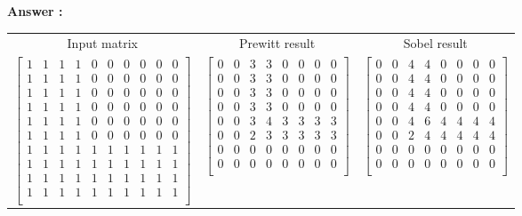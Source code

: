 \begin{list}{
\textbf{Answer :}~}{}
\begin{table}[]
    \centering
    \begin{tabular}{ccc}
        Input matrix & Prewitt result & Sobel result  \\
        $\left[\begin{smallmatrix}
        1 & 1 & 1 & 1 & 0 & 0 & 0 & 0 & 0 & 0\\
        1 & 1 & 1 & 1 & 0 & 0 & 0 & 0 & 0 & 0\\
        1 & 1 & 1 & 1 & 0 & 0 & 0 & 0 & 0 & 0\\
        1 & 1 & 1 & 1 & 0 & 0 & 0 & 0 & 0 & 0\\
        1 & 1 & 1 & 1 & 0 & 0 & 0 & 0 & 0 & 0\\
        1 & 1 & 1 & 1 & 0 & 0 & 0 & 0 & 0 & 0\\
        1 & 1 & 1 & 1 & 1 & 1 & 1 & 1 & 1 & 1\\
        1 & 1 & 1 & 1 & 1 & 1 & 1 & 1 & 1 & 1\\
        1 & 1 & 1 & 1 & 1 & 1 & 1 & 1 & 1 & 1\\
        1 & 1 & 1 & 1 & 1 & 1 & 1 & 1 & 1 & 1\\
        \end{smallmatrix}\right]$ & $\left[\begin{smallmatrix}
        0 & 0 & 3 & 3 & 0 & 0 & 0 & 0\\
        0 & 0 & 3 & 3 & 0 & 0 & 0 & 0\\
        0 & 0 & 3 & 3 & 0 & 0 & 0 & 0\\
        0 & 0 & 3 & 3 & 0 & 0 & 0 & 0\\
        0 & 0 & 3 & 4 & 3 & 3 & 3 & 3\\
        0 & 0 & 2 & 3 & 3 & 3 & 3 & 3\\
        0 & 0 & 0 & 0 & 0 & 0 & 0 & 0\\
        0 & 0 & 0 & 0 & 0 & 0 & 0 & 0\\
        \end{smallmatrix}\right]$ &
        $\left[\begin{smallmatrix}
        0 & 0 & 4 & 4 & 0 & 0 & 0 & 0\\
        0 & 0 & 4 & 4 & 0 & 0 & 0 & 0\\
        0 & 0 & 4 & 4 & 0 & 0 & 0 & 0\\
        0 & 0 & 4 & 4 & 0 & 0 & 0 & 0\\
        0 & 0 & 4 & 6 & 4 & 4 & 4 & 4\\
        0 & 0 & 2 & 4 & 4 & 4 & 4 & 4\\
        0 & 0 & 0 & 0 & 0 & 0 & 0 & 0\\
        0 & 0 & 0 & 0 & 0 & 0 & 0 & 0\\
        \end{smallmatrix}\right]$    
    \end{tabular}
    \label{tab:my_label}
\end{table}


\end{list}
